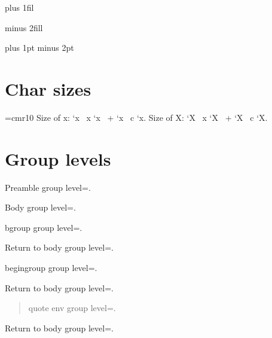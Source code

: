\documentclass{article}
\edef\preamblemsg{\par Preamble group level=\number\currentgrouplevel.}
\begin{document}
\myskip=10pt plus 1fil\relax
\showskip\myskip

\myskip=10pt minus 2fill\relax
\showskip\myskip

\myskip=10pt plus 1pt minus 2pt\relax
\showskip\myskip


\section{Char sizes}
\def\charsize#1#2{
  \the\fontcharwd#1 `#2
\ x \the\fontcharht#1 `#2
\ + \the\fontchardp#1 `#2
\ c \the\fontcharic#1 `#2}

\font\tenrm=cmr10
Size of x: \charsize\tenrm x.
Size of X: \charsize\tenrm X.

\section{Group levels}
\initmsg
\preamblemsg
\par Body group level=\number\currentgrouplevel.
\bgroup
\par bgroup group level=\number\currentgrouplevel.
\egroup
\par Return to body group level=\number\currentgrouplevel.

\begingroup
\par begingroup group level=\number\currentgrouplevel.
\endgroup
\par Return to body group level=\number\currentgrouplevel.

\begin{quote}
\par quote env group level=\number\currentgrouplevel.
\end{quote}
\par Return to body group level=\number\currentgrouplevel.
\end{document}
